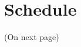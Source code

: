 \documentclass{uva-inf-article}
\begin{document}
\section{Schedule}
(On next page)




\newpage
\printbibliography
\end{document}

